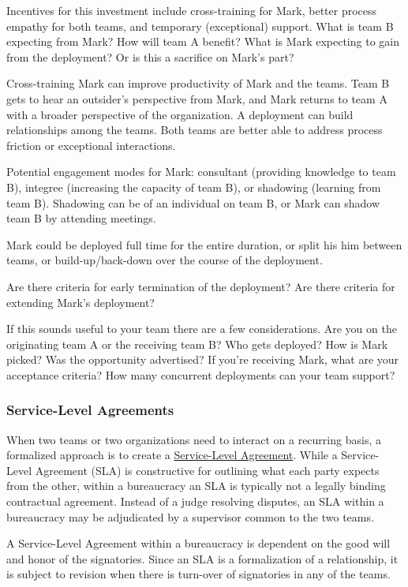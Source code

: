 Incentives for this investment include cross-training for Mark, better process empathy for both teams, and temporary (exceptional) support. What is team B expecting from Mark? How will team A benefit? What is Mark expecting to gain from the deployment? Or is this a sacrifice on Mark's part? 

Cross-training Mark can improve productivity of Mark and the teams. 
Team B gets to hear an outsider's perspective from Mark, and Mark returns to team A with a broader perspective of the organization.
A deployment can build relationships among the teams. Both teams are better able to address process friction or exceptional interactions. 


Potential engagement modes for Mark: consultant (providing knowledge to team B), integree (increasing the capacity of team B), or shadowing (learning from team B). Shadowing can be of an individual on team B, or Mark can shadow team B by attending meetings. 


Mark could be deployed full time for the entire duration, or split his him between teams, or build-up/back-down over the course of the deployment.

Are there criteria for early termination of the deployment? Are there criteria for extending Mark's deployment?

If this sounds useful to your team there are a few considerations. Are you on the originating team A or the receiving team B? Who gets deployed? How is Mark picked? Was the opportunity advertised? If you're receiving Mark, what are your acceptance criteria? How many concurrent deployments can your team support?


\subsubsection{Service-Level Agreements\label{sec:sla}}

When two teams or two organizations need to interact on a recurring basis, a formalized approach is to create a \href{https://en.wikipedia.org/wiki/Service-level_agreement}{Service-Level Agreement}. While a Service-Level Agreement (SLA) is constructive for outlining what each party expects from the other, within a bureaucracy an SLA is typically not a legally binding contractual agreement. Instead of a judge resolving disputes, an SLA within a bureaucracy may be adjudicated by a supervisor common to the two teams.

A Service-Level Agreement within a bureaucracy is dependent on the good will and honor of the signatories. Since an SLA is a formalization of a relationship, it is subject to revision when there is turn-over of signatories in any of the teams. 

